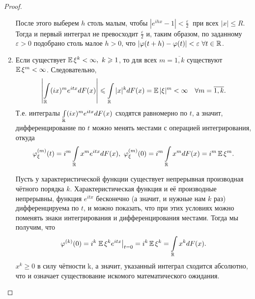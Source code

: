 \begin{proof}
\begin{enumerate}
            После этого выберем $h$ столь малым, чтобы $\left|e^{i h x}-1\right|<\frac{\varepsilon}{2}~$ при всех $|x| \leqslant R$. 
            Тогда и первый интеграл не превосходит $\frac{\varepsilon}{2}$ и, таким образом, по заданному $\varepsilon > 0$ подобрано столь малое $h >0$, что ${|\varphi(t+h)-\varphi(t)|<\varepsilon~ \forall t \in \mathbb{R}}$.
        \item 
            Если существует $\operatorname{\mathbb{E}} \xi^{k}<\infty,~ k \geqslant 1$, то для всех $m = \overline{1, k}$ существуют $\operatorname{\mathbb{E}} \xi^{m}<\infty$. Следовательно,
            \begin{equation*}
                \left|\int\limits_{\mathbb{R}}(i x)^{m} e^{i t x} d F(x)\right| \leqslant \int\limits_{\mathbb{R}}|x|^{k} d F(x)=\operatorname{\mathbb{E}} |\xi|^{m}<\infty \quad \forall m = \overline{1, k}.
            \end{equation*}
            Т.е. интегралы $\int\limits_{\mathbb{R}}(i x)^{m} e^{i t x} d F(x)$ сходятся равномерно по $t$, а значит, дифференцирование по $t$ можно менять местами с операцией интегрирования, откуда
            \begin{equation*}
                \varphi_{\xi}^{(m)}(t)=i^{m} \int\limits_{\mathbb{R}} x^{m} e^{i t x} d F(x),~ \varphi_{\xi}^{(m)}(0)=i^{m} \int\limits_{\mathbb{R}} x^{m} d F(x)=i^{m} \operatorname{\mathbb{E}} \xi^{m}.
            \end{equation*}
            
            Пусть у характеристической функции существует непрерывная производная чётного порядка $k$. 
            Характеристическая функция и её производные непрерывны, функция $e^{itx}$ бесконечно (а значит, и нужные нам $k$ раз) дифференцируема по $t$, 
            и можно показать, что при этих условиях можно поменять знаки интегрирования и дифференцирования местами.
            Тогда мы получим, что
            \begin{equation*}
                \varphi^{(k)}(0) = i^k \left.\operatorname{\mathbb{E}} \xi^k e^{itx}\right|_{t=0} = i^k \operatorname{\mathbb{E}} \xi^k = 
            \int\limits_{\mathbb{R}} x^k dF(x).
            \end{equation*}
            $x^k \geqslant 0$ в силу чётности k, а значит, указанный интеграл сходится абсолютно, что и означает существование искомого математического ожидания.
    \end{enumerate}
\end{proof}